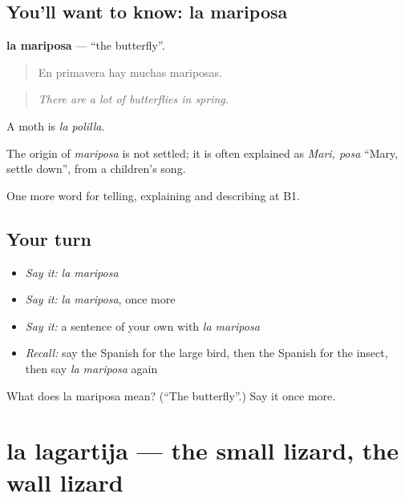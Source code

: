 \subsection*{You'll want to know: la mariposa}
\textbf{la mariposa} — \textquotedblleft{}the butterfly\textquotedblright{}.

\begin{quote}
En primavera hay muchas mariposas.
\end{quote}

\begin{quote}
\emph{There are a lot of butterflies in spring.}
\end{quote}

A moth is \emph{la polilla}.

\begin{cousinweb}
The origin of \emph{mariposa} is not settled; it is often explained as \emph{Mari, posa} \textquotedblleft{}Mary, settle down\textquotedblright{}, from a children’s song.
\end{cousinweb}

\begin{grammarlens}[title={What you've built}]
One more word for telling, explaining and describing at B1.
\end{grammarlens}

\subsection*{Your turn}
\begin{itemize}
\raggedright
  \item \emph{Say it:} \emph{la mariposa}
  \item \emph{Say it:} \emph{la mariposa}, once more
  \item \emph{Say it:} a sentence of your own with \emph{la mariposa}
  \item \emph{Recall:} say the Spanish for the large bird, then the Spanish for the insect, then say \emph{la mariposa} again
\end{itemize}

\begin{tcolorbox}[breakable,colback=teal!4,colframe=teal!35!black,title={Before you move on}]
What does la mariposa mean? (\textquotedblleft{}The butterfly\textquotedblright{}.) Say it once more.
\end{tcolorbox}
\section[la lagartija]{la lagartija — the small lizard, the wall lizard}

